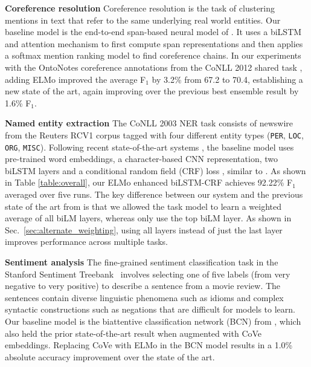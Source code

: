 \documentclass[11pt,a4paper]{article}
\newcommand{\ELMO}{ELMo}
\newcommand{\tinysection}[1]{\textbf{#1}}
\begin{document}
\tinysection{Coreference resolution} Coreference resolution is the task of clustering mentions in text that refer to the same underlying real world entities.
Our baseline model is the end-to-end span-based neural model of \citet{Lee2017EndtoendNC}.
It uses a biLSTM and attention mechanism to first compute span representations and then applies a softmax mention ranking model to find coreference chains.
In our experiments with the OntoNotes coreference annotations from the CoNLL 2012 shared task \citep{Pradhan2012CoNLL2012ST}, adding \ELMO{} improved the average F$_1$ by 3.2\% from 67.2 to 70.4, establishing a new state of the art, again improving over the previous best ensemble result by 1.6\% F$_1$.

\tinysection{Named entity extraction}
The CoNLL 2003 NER task \citep{CoNLL2003NER} consists of newswire from the Reuters RCV1 corpus tagged with four different entity types (\texttt{PER}, \texttt{LOC}, \texttt{ORG}, \texttt{MISC}).
Following recent state-of-the-art systems \citep{lample-EtAl:2016:N16-1,Peters2017SemisupervisedST}, the baseline model uses pre-trained word embeddings, a character-based CNN representation, two biLSTM layers and a conditional random field (CRF) loss \citep{CRF:Lafferty2001}, similar to \citet{NLPfromScratch:Collobert2011}.
As shown in Table \ref{table:overall}, our \ELMO{} enhanced biLSTM-CRF achieves 92.22\% F$_1$ averaged over five runs.
The key difference between our system and the previous state of the art from \citet{Peters2017SemisupervisedST} is that we allowed the task model to learn a weighted average of all biLM layers, whereas \citet{Peters2017SemisupervisedST} only use the top biLM layer.
As shown in Sec.~\ref{sec:alternate_weighting}, using all layers instead of just the last layer improves performance across multiple tasks.

\tinysection{Sentiment analysis}
The fine-grained sentiment classification task in the Stanford Sentiment Treebank~\citep[SST-5;][]{socher2013recursive} involves selecting one of five labels (from very negative to very positive) to describe a sentence from a movie review.
The sentences contain diverse linguistic phenomena such as idioms and complex syntactic constructions such as negations that are difficult for models to learn.
Our baseline model is the biattentive classification network (BCN) from \citet{McCann2017LearnedIT}, which also held the prior state-of-the-art result when augmented with CoVe embeddings. Replacing CoVe with \ELMO{} in the BCN model results in a 1.0\% absolute accuracy improvement over the state of the art.
\end{document}

